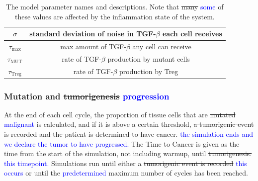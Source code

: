 \documentclass[11pt]{article}
\newcommand{\tcb} { \textcolor{blue} }
\begin{document}
\begin{table}[H]
\begin{center}
\begin{tabular}{|| c | c ||}
  \hline
  $\sigma$ & standard deviation of noise in TGF-$\beta$ each cell receives  \\
  \hline
 $\tau_\text{max}$ & max amount of TGF-$\beta$ any cell can receive \\
  \hline 
 $\tau_\text{MUT}$ & rate of TGF-$\beta$ production by mutant cells\\
  \hline
 $\tau_\text{Treg}$ & rate of TGF-$\beta$ production by Treg\\
  \hline
\end{tabular}
  \caption{The model parameter names and descriptions. Note that \sout{many} \tcb{some} of these values are affected by the inflammation state of the system.}
\end{center}
\end{table}

\subsubsection{Mutation and \sout{tumorigenesis} \tcb{progression}}
At the end of each cell cycle, the proportion of tissue cells that are \sout{mutated} \tcb{malignant} is calculated, and if it is above a certain threshold, \sout{a tumorigenic event is recorded and the patient is determined to have cancer.}
\tcb{the simulation ends and we declare the tumor to have progressed.}
The Time to Cancer is given as the time from the start of the simulation, not including warmup, until \sout{tumorigenesis.} \tcb{this timepoint.}
Simulations run until either a \sout{tumorigenic event is recorded} \tcb{this occurs} or until the \tcb{predetermined} maximum number of cycles has been reached.
\end{document}
